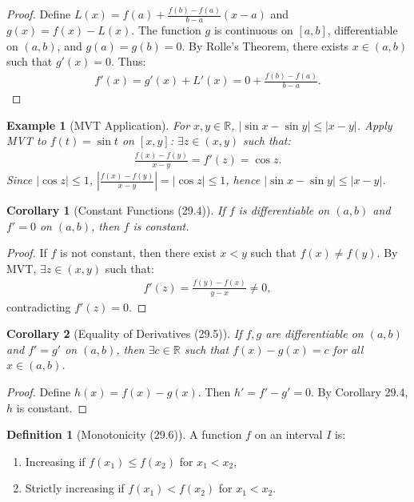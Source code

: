 \documentclass[7pt]{article}
\theoremstyle{definition}
\newtheorem{definition}{Definition}
\theoremstyle{plain}
\newtheorem{example}{Example}
\newtheorem{corollary}{Corollary}
\begin{document}
\begin{proof}
Define $ L(x) = f(a) + \frac{f(b) - f(a)}{b - a}(x - a) $ and $ g(x) = f(x) - L(x) $. The function $ g $ is continuous on $ [a, b] $, differentiable on $ (a, b) $, and $ g(a) = g(b) = 0 $. By Rolle’s Theorem, there exists $ x \in (a, b) $ such that $ g'(x) = 0 $. Thus:
\begin{align}
f'(x) = g'(x) + L'(x) = 0 + \frac{f(b) - f(a)}{b - a}.
\end{align}
\end{proof}

\begin{example}[MVT Application]
For $ x, y \in \mathbb{R} $, $ |\sin x - \sin y| \leq |x - y| $. Apply MVT to $ f(t) = \sin t $ on $ [x, y] $: $ \exists z \in (x, y) $ such that:
\begin{align}
\frac{f(x) - f(y)}{x - y} = f'(z) = \cos z.
\end{align}
Since $ |\cos z| \leq 1 $, $ \left| \frac{f(x) - f(y)}{x - y} \right| = |\cos z| \leq 1 $, hence $ |\sin x - \sin y| \leq |x - y| $.
\end{example}

\begin{corollary}[Constant Functions (29.4)]
If $ f $ is differentiable on $ (a, b) $ and $ f' = 0 $ on $ (a, b) $, then $ f $ is constant.
\end{corollary}

\begin{proof}
If $ f $ is not constant, then there exist $ x < y $ such that $ f(x) \neq f(y) $. By MVT, $ \exists z \in (x, y) $ such that:
\begin{align}
f'(z) = \frac{f(y) - f(x)}{y - x} \neq 0,
\end{align}
contradicting $ f'(z) = 0 $.
\end{proof}

\begin{corollary}[Equality of Derivatives (29.5)]
If $ f, g $ are differentiable on $ (a, b) $ and $ f' = g' $ on $ (a, b) $, then $ \exists c \in \mathbb{R} $ such that $ f(x) - g(x) = c $ for all $ x \in (a, b) $.
\end{corollary}

\begin{proof}
Define $ h(x) = f(x) - g(x) $. Then $ h' = f' - g' = 0 $. By Corollary 29.4, $ h $ is constant.
\end{proof}

\begin{definition}[Monotonicity (29.6)]
A function $ f $ on an interval $ I $ is:
\begin{enumerate}
    \item {Increasing} if $ f(x_1) \leq f(x_2) $ for $ x_1 < x_2 $,
    \item {Strictly increasing} if $ f(x_1) < f(x_2) $ for $ x_1 < x_2 $.
\end{enumerate}
\end{definition}
\end{document}
